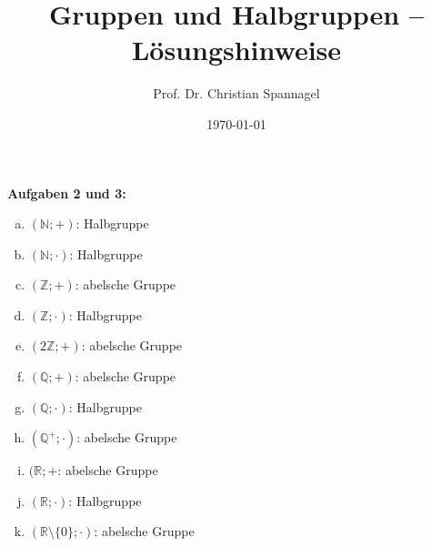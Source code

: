 \documentclass{../cssheet}
\title{Gruppen und Halbgruppen -- Lösungshinweise}
\author{Prof. Dr. Christian Spannagel}
\date{\today}
\begin{document}
\printtitle

\vspace*{10mm}

\textbf{Aufgaben 2 und 3:} 

\begin{enumerate}[a)]
\item $(\mathbb{N}; +)$: Halbgruppe
\item $(\mathbb{N}; \cdot)$: Halbgruppe
\item $(\mathbb{Z}; +)$: abelsche Gruppe
\item $(\mathbb{Z}; \cdot)$: Halbgruppe
\item $(2\mathbb{Z}; +)$: abelsche Gruppe
\item $(\mathbb{Q}; +)$: abelsche Gruppe
\item $(\mathbb{Q}; \cdot)$: Halbgruppe
\item $(\mathbb{Q}^{+}; \cdot)$: abelsche Gruppe
\item $(\mathbb{R}; +$: abelsche Gruppe
\item $(\mathbb{R}; \cdot)$: Halbgruppe
\item $(\mathbb{R}\setminus\{0\}; \cdot)$: abelsche Gruppe
\end{enumerate}

\

\vspace*{2cm}
\printlicense

\printsocials
\end{document}
